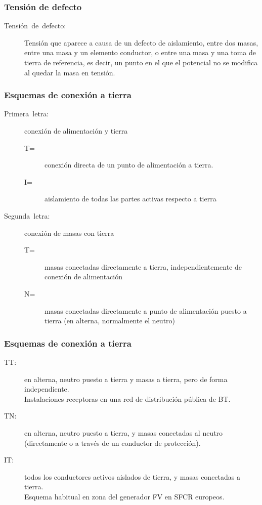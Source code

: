 \documentclass[serif, xcolor=dvipsnames]{beamer}
\begin{document}
\begin{frame}
\frametitle{Tensión de defecto}
\begin{description}
\item [{Tensión~de~defecto:}] Tensión que aparece a causa de un defecto
de aislamiento, entre dos masas, entre una masa y un elemento conductor,
o entre una masa y una toma de tierra de referencia, es decir, un
punto en el que el potencial no se modifica al quedar la masa en tensión.
\end{description}

\end{frame}

\begin{frame}
\frametitle{Esquemas de conexión a tierra}
\begin{description}
\item [{Primera~letra:}] conexión de alimentación y tierra

\begin{description}
\item [{T=}] conexión directa de un punto de alimentación a tierra.
\item [{I=}] aislamiento de todas las partes activas respecto a tierra
\end{description}
\item [{Segunda~letra:}] conexión de masas con tierra

\begin{description}
\item [{T=}] masas conectadas directamente a tierra, independientemente
de conexión de alimentación
\item [{N=}] masas conectadas directamente a punto de alimentación puesto
a tierra (en alterna, normalmente el neutro)
\end{description}
\end{description}

\end{frame}

\begin{frame}
\frametitle{Esquemas de conexión a tierra}
\begin{description}
\item [{TT:}] en alterna, neutro puesto a tierra y masas a tierra, pero
de forma independiente. \\
Instalaciones receptoras en una red de distribución pública de
BT.
\item [{TN:}] en alterna, neutro puesto a tierra, y masas conectadas al
neutro (directamente o a través de un conductor de protección).
\item [{IT:}] todos los conductores activos aislados de tierra, y masas
conectadas a tierra. \\
Esquema habitual en zona del generador FV en SFCR europeos.
\end{description}

\end{frame}
\end{document}
